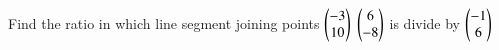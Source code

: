 Find the ratio in which line segment joining points $\myvec{-3\\10}$ $\myvec{6\\-8}$ is divide by  $\myvec{-1\\6}$
